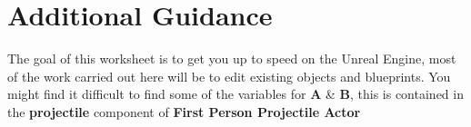 \documentclass{../../fal_assignment}
\begin{document}
\section*{Additional Guidance}

The goal of this worksheet is to get you up to speed on the Unreal Engine, most of the work carried out here will be to edit existing objects and blueprints. You might find it difficult to find some of the variables for \textbf{A} \& \textbf{B}, this is contained in the \textbf{projectile} component of \textbf{First Person Projectile Actor}   


\end{document}
